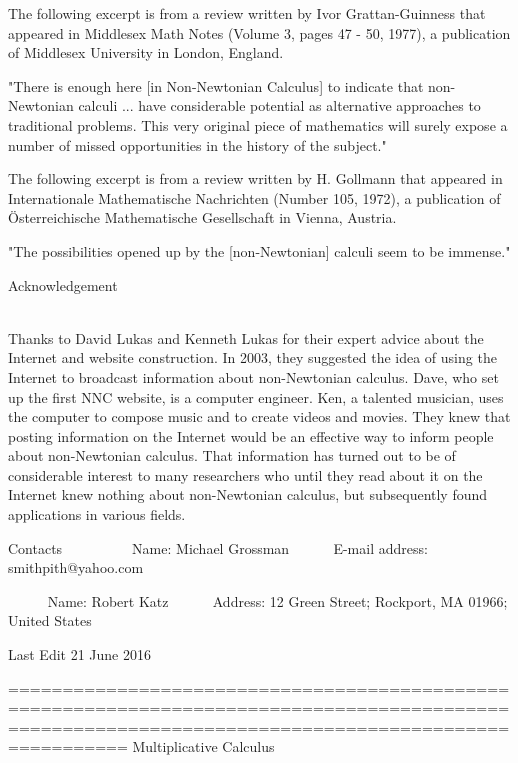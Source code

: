 \documentclass[12pt]{article}
\begin{document}
The following excerpt is from a review written by Ivor Grattan-Guinness that appeared in Middlesex Math Notes (Volume 3, pages 47 - 50, 1977), a publication of Middlesex University in London, England.

"There is enough here [in Non-Newtonian Calculus] to indicate that non-Newtonian calculi ... have considerable potential as alternative approaches to traditional problems. This very original piece of mathematics will surely expose a number of missed opportunities in the history of the subject."


The following excerpt is from a review written by H. Gollmann that appeared in Internationale Mathematische Nachrichten (Number 105, 1972), a publication of Österreichische Mathematische Gesellschaft in Vienna, Austria.

"The possibilities opened up by the [non-Newtonian] calculi seem to be immense."



Acknowledgement                                                                                                                                                           

Thanks to David Lukas and Kenneth Lukas for their expert advice about the Internet and website construction. In 2003, they suggested the idea of using the Internet to broadcast information about non-Newtonian calculus. Dave, who set up the first NNC website, is a computer engineer. Ken, a talented musician, uses the computer to compose music and to create videos and movies. They knew that posting information on the Internet would be an effective way to inform people about non-Newtonian calculus. That information has turned out to be of considerable interest to many researchers who until they read about it on the Internet knew nothing about non-Newtonian calculus, but subsequently found applications in various fields. 



Contacts
    
      Name: Michael Grossman
      E-mail address: smithpith@yahoo.com

      Name: Robert Katz
      Address: 12 Green Street; Rockport, MA 01966; United States  



Last Edit
21 June 2016

=====================================================================================================================================================
Multiplicative Calculus
\end{document}
